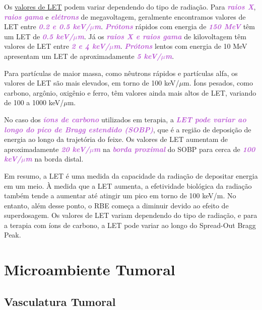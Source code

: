 \documentclass[11pt,a4paper]{article}
\begin{document}
	Os \hyperref[exp:let]{valores de LET} podem variar dependendo do tipo de radiação. Para \textcolor{MediumOrchid}{\textbf{\textit{raios X}}}, \textcolor{MediumOrchid}{\textbf{\textit{raios gama}}} e \textcolor{MediumOrchid}{\textbf{\textit{elétrons}}} de megavoltagem, geralmente encontramos valores de LET entre \textcolor{MediumOrchid}{\textbf{\textit{0.2 e 0.5 keV/$\mu$m}}}. \textcolor{MediumOrchid}{\textbf{\textit{Prótons}}} rápidos com energia de \textcolor{MediumOrchid}{\textbf{\textit{150 MeV}}} têm um LET de \textcolor{MediumOrchid}{\textbf{\textit{0.5 keV/$\mu$m}}}. Já os \textcolor{MediumOrchid}{\textbf{\textit{raios X e raios gama}}} de kilovoltagem têm valores de LET entre \textcolor{MediumOrchid}{\textbf{\textit{2 e 4 keV/$\mu$m}}}. \textcolor{MediumOrchid}{\textbf{\textit{Prótons}}} lentos com energia de 10 MeV apresentam um LET de aproximadamente \textcolor{MediumOrchid}{\textbf{\textit{5 keV/$\mu$m}}}.

	Para partículas de maior massa, como nêutrons rápidos e partículas alfa, os valores de LET são mais elevados, em torno de 100 keV/$\mu$m. Íons pesados, como carbono, argônio, oxigênio e ferro, têm valores ainda mais altos de LET, variando de 100 a 1000 keV/$\mu$m.

	No caso dos \textcolor{MediumOrchid}{\textbf{\textit{íons de carbono}}} utilizados em terapia, a \textcolor{MediumOrchid}{\textbf{\textit{LET pode variar ao longo do pico de Bragg estendido (SOBP)}}}, que é a região de deposição de energia ao longo da trajetória do feixe. Os valores de LET aumentam de aproximadamente \textcolor{MediumOrchid}{\textbf{\textit{20 keV/$\mu$m}}} na \textcolor{MediumOrchid}{\textbf{\textit{borda proximal}}} do SOBP para cerca de \textcolor{MediumOrchid}{\textbf{\textit{100 keV/$\mu$m}}} na borda distal.

	Em resumo, a LET é uma medida da capacidade da radiação de depositar energia em um meio. À medida que a LET aumenta, a efetividade biológica da radiação também tende a aumentar até atingir um pico em torno de 100 keV/\mu m. No entanto, além desse ponto, o RBE começa a diminuir devido ao efeito de superdosagem. Os valores de LET variam dependendo do tipo de radiação, e para a terapia com íons de carbono, a LET pode variar ao longo do Spread-Out Bragg Peak.

\section{Microambiente Tumoral}

\subsection*{Vasculatura Tumoral}
\end{document}
